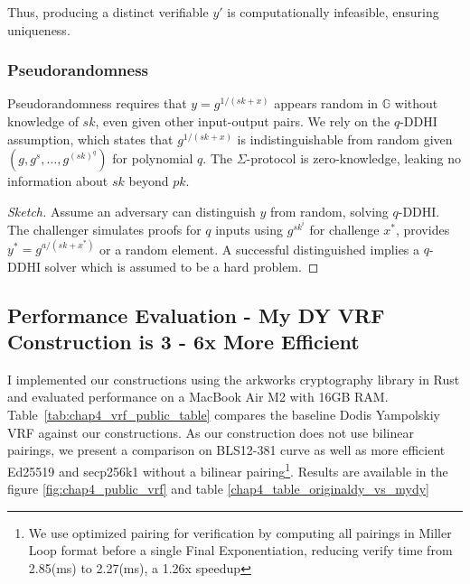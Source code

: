Thus, producing a distinct verifiable $y'$ is computationally infeasible, ensuring uniqueness.

\subsubsection{Pseudorandomness}

Pseudorandomness requires that $y = g^{1/(sk + x)}$ appears random in $\mathbb{G}$ without knowledge of $sk$, even given other input-output pairs. We rely on the $q$-DDHI assumption, which states that $g^{1/(sk + x)}$ is indistinguishable from random given $(g, g^{s}, \ldots, g^{(sk)^q})$ for polynomial $q$. 
The $\Sigma$-protocol is zero-knowledge, leaking no information about $sk$ beyond $pk$.

\begin{proof}[Sketch]
    Assume an adversary can distinguish $y$ from random, solving $q$-DDHI. The challenger simulates proofs for $q$ inputs using $g^{sk^i}$ for challenge $x^*$, provides $y^* = g^{a/(sk + x^*)}$ or a random element. A successful distinguished implies a $q$-DDHI solver which is assumed to be a hard problem.
\end{proof}


\subsection{Performance Evaluation - My DY VRF Construction is 3 - 6x More Efficient}

I implemented our constructions \cite{polgar_anonymous_2025} using the arkworks cryptography library \cite{arkworks_contributors_arkworks_2022} in Rust and evaluated performance on a MacBook Air M2 with 16GB RAM. Table~\ref{tab:chap4_vrf_public_table} compares the baseline Dodis Yampolskiy VRF against our constructions. As our construction does not use bilinear pairings, we present a comparison on BLS12-381 curve as well as more efficient Ed25519 and secp256k1 without a bilinear pairing\footnote{We use optimized pairing for verification by computing all pairings in Miller Loop format before a single Final Exponentiation, reducing verify time from 2.85(ms) to 2.27(ms), a 1.26x speedup}. Results are available in the figure \ref{fig:chap4_public_vrf} and table \ref{chap4_table_originaldy_vs_mydy}


